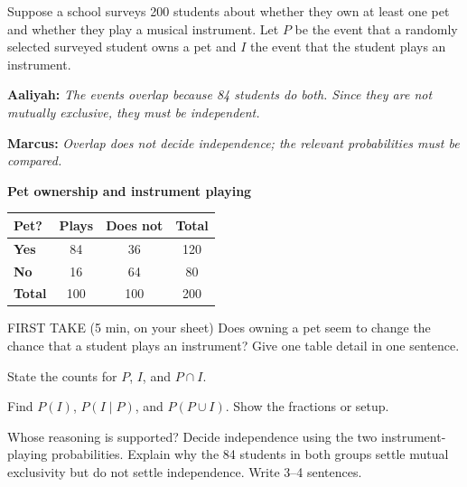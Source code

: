 \documentclass[14pt]{extarticle}
\begin{document}
\pagestyle{empty}


\noindent\begin{minipage}[t]{0.57\linewidth}
\vspace{0pt}
Suppose a school surveys 200 students about whether they own at least one pet and whether they play a musical instrument. Let $P$ be the event that a randomly selected surveyed student owns a pet and $I$ the event that the student plays an instrument.\par\smallskip \textbf{Aaliyah:} \emph{The events overlap because 84 students do both. Since they are not mutually exclusive, they must be independent.}\par \textbf{Marcus:} \emph{Overlap does not decide independence; the relevant probabilities must be compared.}\par
\end{minipage}\hfill
\begin{minipage}[t]{0.40\linewidth}
\vspace{0pt}
\begin{center}
\textbf{Pet ownership and instrument playing}\par\smallskip
\begin{tabular}{|l|c|c|c|}
\hline
\textbf{Pet?} & \textbf{Plays} & \textbf{Does not} & \textbf{Total} \\ \hline
\textbf{Yes} & 84 & 36 & 120 \\ \hline
\textbf{No} & 16 & 64 & 80 \\ \hline
\textbf{Total} & 100 & 100 & 200 \\ \hline
\end{tabular}
\end{center}
\end{minipage}

\begin{firsttakebox}{FIRST TAKE (5 min, on your sheet)}
Does owning a pet seem to change the chance that a student plays an instrument? Give one table detail in one sentence.
\end{firsttakebox}

\begin{description}[leftmargin=1.15in, labelwidth=1in, itemsep=2pt, topsep=2pt]
  \item[\dokbadge{1}~(a)] State the counts for $P$, $I$, and $P\cap I$.
  \item[\dokbadge{2}~(b)] Find $P(I)$, $P(I\mid P)$, and $P(P\cup I)$. Show the fractions or setup.
  \item[\dokbadge{3}~(c)] Whose reasoning is supported? Decide independence using the two instrument-playing probabilities. Explain why the 84 students in both groups settle mutual exclusivity but do not settle independence. Write 3--4 sentences.
\end{description}
\end{document}
